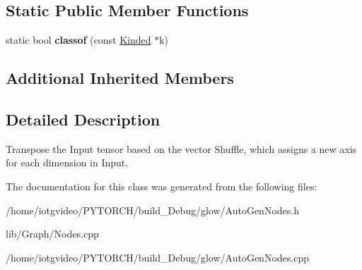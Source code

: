 \subsection*{Static Public Member Functions}
\begin{DoxyCompactItemize}
\item 
\mbox{\label{classglow_1_1_transpose_node_ab4c2adb2ab62b6165d7a3afa7f62d85a}} 
static bool {\bfseries classof} (const \hyperlink{classglow_1_1_kinded}{Kinded} $\ast$k)
\end{DoxyCompactItemize}
\subsection*{Additional Inherited Members}


\subsection{Detailed Description}
Transpose the Input tensor based on the vector Shuffle, which assigns a new axis for each dimension in Input. 

The documentation for this class was generated from the following files\+:\begin{DoxyCompactItemize}
\item 
/home/iotgvideo/\+P\+Y\+T\+O\+R\+C\+H/build\+\_\+\+Debug/glow/Auto\+Gen\+Nodes.\+h\item 
lib/\+Graph/Nodes.\+cpp\item 
/home/iotgvideo/\+P\+Y\+T\+O\+R\+C\+H/build\+\_\+\+Debug/glow/Auto\+Gen\+Nodes.\+cpp\end{DoxyCompactItemize}
